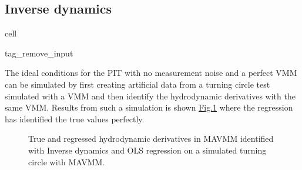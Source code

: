 \documentclass[review]{elsarticle}
\begin{document}
\subsection{Inverse dynamics}
\label{\detokenize{06.40_results_inverse_dynamics:inverse-dynamics}}\label{\detokenize{06.40_results_inverse_dynamics::doc}}
\begin{sphinxuseclass}{cell}
\begin{sphinxuseclass}{tag_remove_input}
\end{sphinxuseclass}
\end{sphinxuseclass}
\sphinxAtStartPar
The ideal conditions for the PIT with no measurement noise and a perfect VMM can be simulated by first creating artificial data from a turning circle test simulated with a VMM and then identify the hydrodynamic derivatives with the same VMM. Results from such a simulation is shown \hyperref[\detokenize{06.40_results_inverse_dynamics:fig-bar-parameters}]{Fig.\@ \ref{\detokenize{06.40_results_inverse_dynamics:fig-bar-parameters}}} where the regression has identified the true values perfectly.

\begin{figure}[H]
\centering
\capstart

\noindent{}
\caption{True and regressed hydrodynamic derivatives in MAVMM identified with Inverse dynamics and OLS regression on a simulated turning circle with MAVMM.}\label{\detokenize{06.40_results_inverse_dynamics:fig-bar-parameters}}\end{figure}
\end{document}
